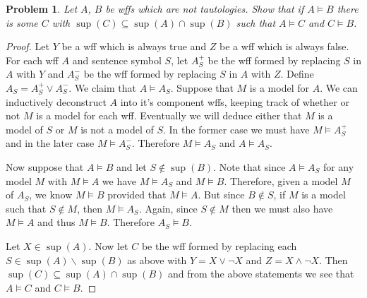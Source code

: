 \documentclass{article}
\newtheorem{problem}{Problem}
\begin{document}
\begin{problem}
Let $A$, $B$ be wffs which are not tautologies. Show that if $A \models B$ there is some $C$ with $\sup(C) \subseteq \sup(A) \cap \sup(B)$ such that $A \models C$ and $C \models B$.
\end{problem}
\begin{proof}
Let $Y$ be a wff which is always true and $Z$ be a wff which is always false. For each wff $A$ and sentence symbol $S$, let $A_S^+$ be the wff formed by replacing $S$ in $A$ with $Y$ and $A_S^-$ be the wff formed by replacing $S$ in $A$ with $Z$. Define $A_S = A_S^+ \vee A_S^-$. We claim that $A \models A_S$. Suppose that $M$ is a model for $A$. We can inductively deconstruct $A$ into it's component wffs, keeping track of whether or not $M$ is a model for each wff. Eventually we will deduce either that $M$ is a model of $S$ or $M$ is not a model of $S$. In the former case we must have $M \models A_S^+$ and in the later case $M \models A_S^-$. Therefore $M \models A_S$ and $A \models A_S$.

Now suppose that $A \models B$ and let $S \notin \sup(B)$. Note that since $A \models A_S$ for any model $M$ with $M \models A$ we have $M \models A_S$ and $M \models B$. Therefore, given a model $M$ of $A_S$, we know $M \models B$ provided that $M \models A$. But since $B \notin S$, if $M$ is a model such that $S \notin M$, then $M \models A_S$. Again, since $S \notin M$ then we must also have $M \models A$ and thus $M \models B$. Therefore $A_S \models B$.

Let $X \in \sup(A)$. Now let $C$ be the wff formed by replacing each $S \in \sup(A) \backslash \sup(B)$ as above with $Y = X \vee \neg X$ and $Z = X \wedge \neg X$. Then $\sup(C) \subseteq \sup(A) \cap \sup(B)$ and from the above statements we see that $A \models C$ and $C \models B$.
\end{proof}
\end{document}
